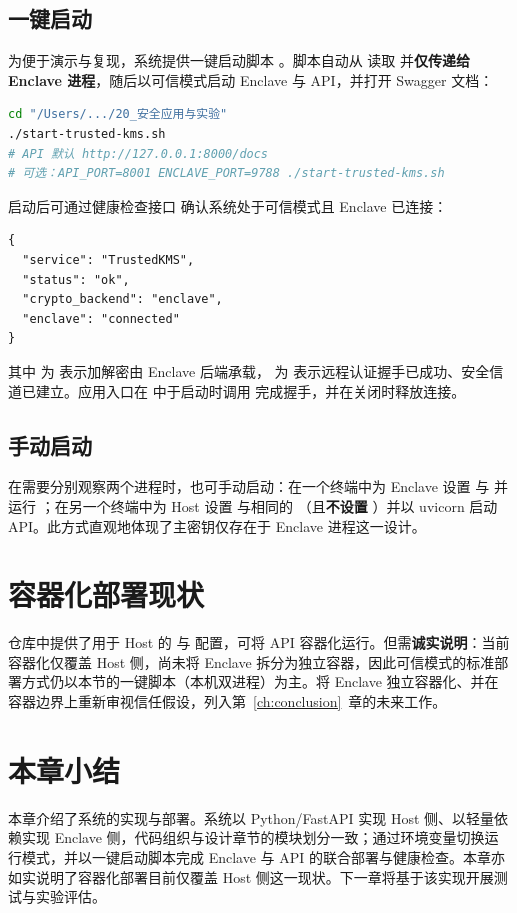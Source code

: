 \subsection{一键启动}

为便于演示与复现，系统提供一键启动脚本 。脚本自动从  读取  并\textbf{仅传递给 Enclave 进程}，随后以可信模式启动 Enclave 与 API，并打开 Swagger 文档：

\begin{lstlisting}[language=bash]
cd "/Users/.../20_安全应用与实验"
./start-trusted-kms.sh
# API 默认 http://127.0.0.1:8000/docs
# 可选：API_PORT=8001 ENCLAVE_PORT=9788 ./start-trusted-kms.sh
\end{lstlisting}

启动后可通过健康检查接口  确认系统处于可信模式且 Enclave 已连接：

\begin{lstlisting}[language={}]
{
  "service": "TrustedKMS",
  "status": "ok",
  "crypto_backend": "enclave",
  "enclave": "connected"
}
\end{lstlisting}

其中  为  表示加解密由 Enclave 后端承载， 为  表示远程认证握手已成功、安全信道已建立。应用入口在  中于启动时调用  完成握手，并在关闭时释放连接。

\subsection{手动启动}

在需要分别观察两个进程时，也可手动启动：在一个终端中为 Enclave 设置  与  并运行 ；在另一个终端中为 Host 设置  与相同的 （且\textbf{不设置} ）并以 uvicorn 启动 API。此方式直观地体现了主密钥仅存在于 Enclave 进程这一设计。

\section{容器化部署现状}

仓库中提供了用于 Host 的  与  配置，可将 API 容器化运行。但需\textbf{诚实说明}：当前容器化仅覆盖 Host 侧，尚未将 Enclave 拆分为独立容器，因此可信模式的标准部署方式仍以本节的一键脚本（本机双进程）为主。将 Enclave 独立容器化、并在容器边界上重新审视信任假设，列入第~\ref{ch:conclusion}~章的未来工作。

\section{本章小结}

本章介绍了系统的实现与部署。系统以 Python/FastAPI 实现 Host 侧、以轻量依赖实现 Enclave 侧，代码组织与设计章节的模块划分一致；通过环境变量切换运行模式，并以一键启动脚本完成 Enclave 与 API 的联合部署与健康检查。本章亦如实说明了容器化部署目前仅覆盖 Host 侧这一现状。下一章将基于该实现开展测试与实验评估。
